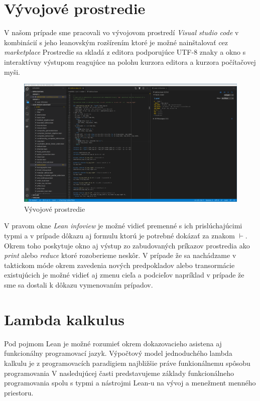 \documentclass[a4paper,10pt,oneside]{report}%
\begin{document}
\section{Vývojové prostredie}
    V našom prípade sme pracovali vo vývojovom prostredí \emph{Visual studio code}
v kombinácií s jeho leanovským rozšírením ktoré je možné nainštalovať cez
\emph{marketplace} Prostredie sa skladá z editora podporujúce UTF-8 znaky a okno s
interaktívny výstupom reagujúce na polohu kurzora editora a kurzora počítačovej
myši.
\begin{center}
    \begin{figure}[!ht]
        \centering
        \includegraphics[scale=0.25]{vscode_printscreen.png}
        \caption{Vývojové prostredie}
    \end{figure}
\end{center}
    V pravom okne \emph{Lean infoview} je možné vidieť premenné s ich prislúchajúcimi
typmi a v prípade dôkazu aj formulu ktorú je potrebné dokázať za znakom $\vdash$.
    Okrem toho poskytuje okno aj výstup zo zabudovaných príkazov prostredia
ako \emph{print} alebo \emph{reduce} ktoré rozoberieme neskôr.
    V prípade že sa nachádzame v taktickom móde okrem zavedenia nových predpokladov
alebo transormácie existujúcich je možné vidieť aj zmenu cieľa a podcieľov
napríklad v prípade že sme sa dostali k dôkazu vymenovaním prípadov.
\section{Lambda kalkulus}
Pod pojmom Lean je možné rozumieť okrem dokazovacieho asistena aj funkcionálny programovací
    jazyk.
Výpočtový model jednoduchého lambda kalkulu je z programovacích paradigiem najbližšie
    práve funkionálnemu spôsobu programovania 
V nasledujúcej časti predstavujeme základy funkcionálneho programovania spolu 
    s typmi a nástrojmi Lean-u na vývoj a menežment menného priestoru.
\end{document}
